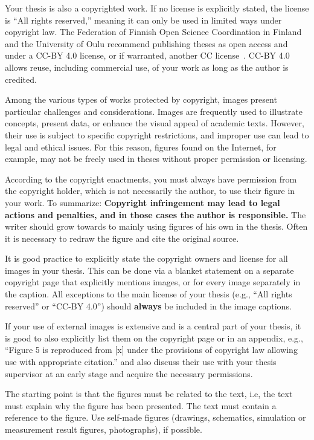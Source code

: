 Your thesis is also a copyrighted work. If no license is explicitly
stated, the license is \enquote{All rights reserved,} meaning it can only be
used in limited ways under copyright law. The Federation of Finnish
Open Science Coordination in Finland and the University of Oulu
recommend publishing theses as open access and under a CC-BY 4.0 license,
or if warranted, another CC license~\cite{coordination_open_2024}.
CC-BY 4.0 allows reuse, including commercial use, of your work as long as
the author is credited.

Among the various types of works protected by copyright, images
present particular challenges and considerations. Images are
frequently used to illustrate concepts, present data, or enhance the
visual appeal of academic texts. However, their use is subject to
specific copyright restrictions, and improper use can lead to legal
and ethical issues.  For this reason, figures found on the Internet,
for example, may not be freely used in theses without proper
permission or licensing.

According to the copyright enactments, you must always have
permission from the copyright holder, which is not necessarily the
author, to use their figure in your work. To summarize:
\textbf{Copyright infringement may lead to legal actions and
penalties, and in those cases the author is responsible.} The writer
should grow towards to mainly using figures of his own in the
thesis. Often it is necessary to redraw the figure and cite the
original source.

It is good practice to explicitly state the copyright owners and
license for all images in your thesis. This can be done via a blanket
statement on a separate copyright page that explicitly mentions
images, or for every image separately in the caption. All exceptions
to the main license of your thesis (e.g., \enquote{All rights reserved} or
\enquote{CC-BY 4.0}) should \textbf{always} be included in the image
captions.

If your use of external images is extensive and is a central part of
your thesis, it is good to also explicitly list them on the copyright
page or in an appendix, e.g., ``Figure 5 is reproduced from [x] under
the provisions of copyright law allowing use with appropriate
citation.'' and also discuss their use with your thesis supervisor at
an early stage and acquire the necessary permissions.

The starting point is that the figures must be related to the text,
i.e, the text must explain why the figure has been presented. The text
must contain a reference to the figure. Use self-made figures
(drawings, schematics, simulation or measurement result figures,
photographs), if possible.

